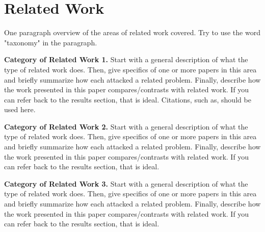 \section{Related Work}
\label{relatedwork}

One paragraph overview of the areas of
related work covered. Try to use the word
"taxonomy" in the paragraph.

\textbf{Category of Related Work 1.} Start with
a general description of what the type of related
work does. Then, give specifics of one or more
papers in this area and briefly summarize how each
attacked a related problem. Finally, describe
how the work presented in this paper compares/contrasts
with related work. If you can refer back to the
results section, that is ideal. Citations, such as, should be used here.

\textbf{Category of Related Work 2.} Start with
a general description of what the type of related
work does. Then, give specifics of one or more
papers in this area and briefly summarize how each
attacked a related problem. Finally, describe
how the work presented in this paper compares/contrasts
with related work. If you can refer back to the
results section, that is ideal.

\textbf{Category of Related Work 3.} Start with
a general description of what the type of related
work does. Then, give specifics of one or more
papers in this area and briefly summarize how each
attacked a related problem. Finally, describe
how the work presented in this paper compares/contrasts
with related work. If you can refer back to the
results section, that is ideal.
